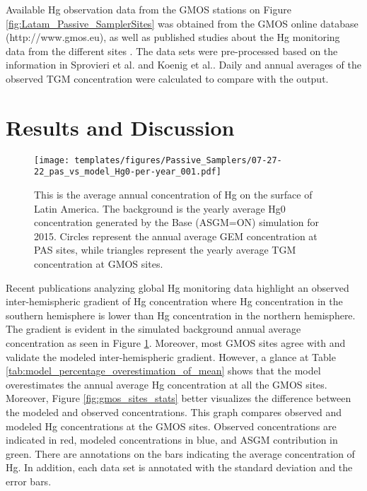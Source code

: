 \begin{flushleft}
  Available Hg observation data from the GMOS stations on Figure  \ref{fig:Latam_Passive_SamplerSites} was obtained from the GMOS online database (http://www.gmos.eu), as well as published studies about the Hg monitoring data from the different sites  \cite{koenig_seasonal_2021,sprovieri_atmospheric_2016}. The data sets were pre-processed based on the information in Sprovieri et al.\cite{sprovieri_atmospheric_2016} and Koenig et al.\cite{koenig_seasonal_2021}. Daily and annual averages of the observed TGM concentration were calculated to compare with the \gc output. 
\end{flushleft}





\section{Results and Discussion}\label{c2_results}
\begin{figure}[H]
\centering
  \texttt{[image: templates/figures/Passive\_Samplers/07-27-22\_pas\_vs\_model\_Hg0-per-year\_001.pdf]}
  \caption{This is the average annual concentration of Hg on the surface of Latin America. The background is the yearly average Hg0 concentration generated by the Base (ASGM=ON) simulation for 2015. Circles represent the annual average GEM concentration at PAS sites, while triangles represent the yearly average TGM concentration at GMOS sites\cite{quant_measuring_2021,sprovieri_atmospheric_2016,koenig_seasonal_2021}.}
  \label{fig:06-12-22_pas_vs_model_Hg0-per-year_001}
  
  
\end{figure}
\FloatBarrier
\begin{flushleft}
 Recent publications analyzing global Hg monitoring data highlight an observed inter-hemispheric gradient of Hg concentration where Hg concentration in the southern hemisphere is lower than Hg concentration in the northern hemisphere\cite{united_nations_environment_programme_technical_2019,sprovieri_atmospheric_2016}. The gradient is evident in the simulated background annual average \hg concentration as seen in Figure \ref{fig:06-12-22_pas_vs_model_Hg0-per-year_001}. Moreover, most GMOS sites agree with and validate the modeled inter-hemispheric gradient. However, a glance at Table \ref{tab:model_percentage_overestimation_of_mean} shows that the model overestimates the annual average Hg concentration at all the GMOS sites. Moreover, Figure \ref{fig:gmos_sites_stats} better visualizes the difference between the modeled and observed concentrations. This graph compares observed and modeled Hg concentrations at the GMOS sites. Observed concentrations are indicated in red, modeled concentrations in blue, and ASGM contribution in green. There are annotations on the bars indicating the average concentration of Hg. In addition, each data set is annotated with the standard deviation and the error bars.
\end{flushleft}



